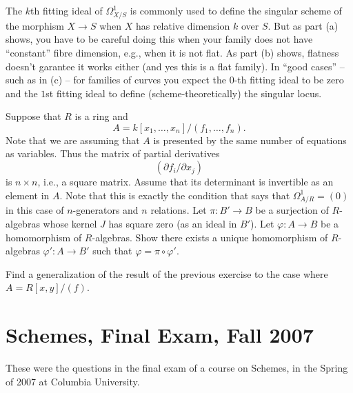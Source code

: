 \begin{remark}
\label{exercise-fitting-omega-not-sings}
The $k$th fitting ideal of $\Omega^1_{X/S}$ is commonly used
to define the singular scheme of the morphism $X \to S$ when $X$ has relative
dimension $k$ over $S$. But as part (a) shows, you have to be careful doing
this when your family does not have ``constant'' fibre dimension, e.g., when
it is not flat. As part (b) shows, flatness doesn't garantee it works either
(and yes this is a flat family). In ``good cases'' -- such as in (c) -- for
families of curves you expect the $0$-th fitting ideal to be zero and
the $1$st fitting ideal to define (scheme-theoretically) the singular locus.
\end{remark}

\begin{exercise}
\label{exercise-formally-smooth}
Suppose that $R$ is a ring and
$$
A = k[x_1, \ldots, x_n]/(f_1, \ldots, f_n).
$$
Note that we are assuming that $A$ is presented by the same
number of equations as variables. Thus the matrix of partial
derivatives
$$
( \partial f_i / \partial x_j )
$$
is $n\times n$, i.e., a square matrix. Assume that
its determinant is invertible as an element in $A$. Note that
this is exactly the condition that says that $\Omega^1_{A/R} = (0)$
in this case of $n$-generators and $n$ relations.
Let $\pi : B' \to B$ be a surjection of $R$-algebras
whose kernel $J$ has square zero (as an ideal in $B'$).
Let $\varphi : A \to B$ be a homomorphism of $R$-algebras.
Show there exists a unique homomorphism of $R$-algebras
$\varphi' : A \to B'$ such that $\varphi = \pi \circ \varphi'$.
\end{exercise}

\begin{exercise}
\label{exercise-formally-smooth-one-equation}
Find a generalization
of the result of the previous exercise to the case where $A = R[x, y]/(f)$.
\end{exercise}



\section{Schemes, Final Exam, Fall 2007}
\label{section-final-exam-fall-2007}

\noindent
These were the questions in the final exam of a course on Schemes,
in the Spring of 2007 at Columbia University.

